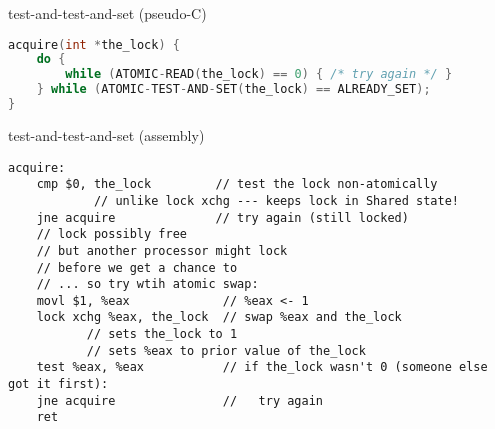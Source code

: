 \begin{frame}[fragile,label=testAndTestAndSetC]{test-and-test-and-set (pseudo-C)}
\begin{lstlisting}[language=C,style=smaller]
acquire(int *the_lock) {
    do {
        while (ATOMIC-READ(the_lock) == 0) { /* try again */ }
    } while (ATOMIC-TEST-AND-SET(the_lock) == ALREADY_SET);
}
\end{lstlisting}
\end{frame}

\begin{frame}[fragile,label=testAndTestAndSetASM]{test-and-test-and-set (assembly)}
\begin{lstlisting}[language=myasm,style=smaller]
acquire:
    cmp $0, the_lock         // test the lock non-atomically
            // unlike lock xchg --- keeps lock in Shared state!
    jne acquire              // try again (still locked)
    // lock possibly free
    // but another processor might lock
    // before we get a chance to
    // ... so try wtih atomic swap:
    movl $1, %eax             // %eax <- 1
    lock xchg %eax, the_lock  // swap %eax and the_lock
           // sets the_lock to 1
           // sets %eax to prior value of the_lock
    test %eax, %eax           // if the_lock wasn't 0 (someone else got it first):
    jne acquire               //   try again
    ret
\end{lstlisting}
\end{frame}

